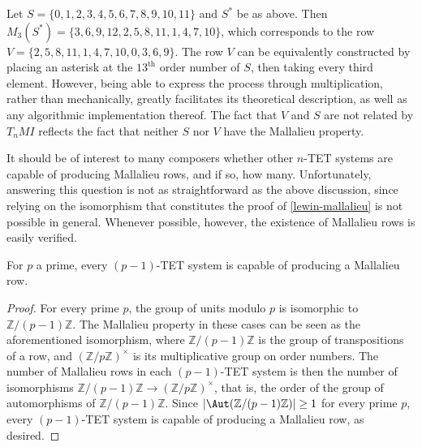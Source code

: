 \begin{example}
	Let $S = \{ 0, 1, 2, 3, 4, 5, 6, 7, 8, 9, 10, 11 \}$ and $S^*$ be as above. Then $M_3(S^*) = \{ 3, 6, 9, 12, 2, 5, 8, 11, 1, 4, 7, 10 \}$, which corresponds to the row $V = \{ 2, 5, 8, 11, 1, 4, 7, 10, 0, 3, 6, 9 \}$. The row $V$ can be equivalently constructed by placing an asterisk at the $13^\text{th}$ order number of $S$, then taking every third element. However, being able to express the process through multiplication, rather than mechanically, greatly facilitates its theoretical description, as well as any algorithmic implementation thereof. The fact that $V$ and $S$ are not related by $T_nMI$ reflects the fact that neither $S$ nor $V$ have the Mallalieu property.
\end{example}

It should be of interest to many composers whether other $n$-TET systems are capable of producing Mallalieu rows, and if so, how many. Unfortunately, answering this question is not as straightforward as the above discussion, since relying on the isomorphism that constitutes the proof of \ref{lewin-mallalieu} is not possible in general. Whenever possible, however, the existence of Mallalieu rows is easily verified.

\begin{proposition}
	\label{lewin-mallalieu}
	\cite[285]{Lewin1966}
	For $p$ a prime, every $(p - 1)$-TET system is capable of producing a Mallalieu row.
	\begin{proof}
		For every prime $p$, the group of units modulo $p$ is isomorphic to $\mathbb{Z} / (p - 1) \mathbb{Z}$. The Mallalieu property in these cases can be seen as the aforementioned isomorphism, where $\mathbb{Z} / (p - 1) \mathbb{Z}$ is the group of transpositions of a row, and $(\mathbb{Z} / p \mathbb{Z})^\times$ is its multiplicative group on order numbers. The number of Mallalieu rows in each $(p - 1)$-TET system is then the number of isomorphisms $\mathbb{Z} / (p - 1) \mathbb{Z} \to (\mathbb{Z} / p \mathbb{Z})^\times$, that is, the order of the group of automorphisms of $\mathbb{Z} / (p - 1) \mathbb{Z}$. Since $|\Aut(\mathbb{Z} / (p - 1) \mathbb{Z})| \geq 1$ for every prime $p$, every $(p - 1)$-TET system is capable of producing a Mallalieu row, as desired.
	\end{proof}
\end{proposition}


